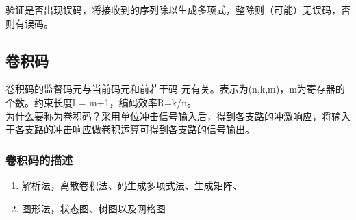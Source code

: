 验证是否出现误码，将接收到的序列除以生成多项式，整除则（可能）无误码，否则有误码。
\subsection{卷积码}
卷积码的监督码元与当前码元和前若干码
元有关。表示为(n,k,m)，m为寄存器的个数。约束长度l = m+1，编码效率R=k/n。\\
为什么要称为卷积码？采用单位冲击信号输入后，得到各支路的冲激响应，将输入于各支路的冲击响应做卷积运算可得到各支路的信号输出。
\subsubsection{卷积码的描述}
\begin{enumerate}
	\item 解析法，离散卷积法、码生成多项式法、生成矩阵、
	\item 图形法，状态图、树图以及网格图
\end{enumerate}
